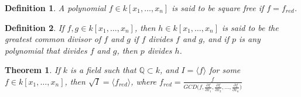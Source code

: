 \documentclass[oneside]{book}
\theoremstyle{mystyle}
\newtheorem{theorem}{Theorem}[section]
\newtheorem{definition}{Definition}[section]
\begin{document}
\begin{definition}
A polynomial $f\in k[x_1,\hdots ,x_n]$ is said to be square free if $f = f_{red}$.
\end{definition}
\begin{definition}
If $f,g\in k[x_1,\hdots ,x_n]$, then $h\in k[x_1,\hdots ,x_n]$ is said to be the greatest common divisor of $f$ and $g$ if $f$ divides $f$ and $g$, and if $p$ is any polynomial that divides $f$ and $g$, then $p$ divides $h$.
\end{definition}
\begin{theorem}
If $k$ is a field such that $\mathbb{Q} \subset k$, and $I = \langle f\rangle$ for some $f\in k[x_1,\hdots ,x_n]$, then $\sqrt{I} = \langle f_{red}\rangle$, where $f_{red} = \frac{f}{GCD\big(f, \frac{\partial f}{\partial x_1}, \frac{\partial f}{\partial x_2}, \hdots, \frac{\partial f}{\partial x_n}\big)}$
\end{theorem}
\end{document}
